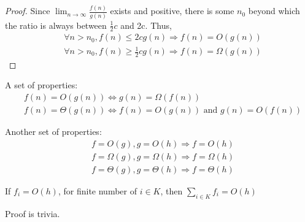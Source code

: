 				\begin{proof}
					Since $\lim_{n\rightarrow \infty} \frac{f(n)}{g(n)}$ exists and positive, there is some $n_0$ beyond which the ratio is always between $\frac12 c$ and 2c. Thus,
					\begin{align}
						& \forall n > n_0, f(n) \le 2cg(n) \Rightarrow f(n) = O(g(n)) \\
						& \forall n > n_0, f(n) \ge \frac12cg(n) \Rightarrow f(n) = \Omega(g(n))
					\end{align}
				\end{proof}

				A set of properties:
				\begin{align}
					& f(n) = O(g(n)) \iff g(n) = \Omega(f(n))\\
					& f(n) = \Theta(g(n)) \iff f(n) = O(g(n)) \text{ and } g(n) = O(f(n))
				\end{align}

				Another set of properties:
				\begin{align}
					& f = O(g), g = O(h) \Rightarrow f=O(h) \\
					& f = \Omega(g), g = \Omega(h) \Rightarrow f=\Omega(h) \\
					& f = \Theta(g), g = \Theta(h) \Rightarrow f=\Theta(h)
				\end{align}

				\begin{theorem}
					If $f_i = O(h)$, for finite number of $i \in K$, then $\sum_{i\in K} f_i = O(h)$
				\end{theorem}

				Proof is trivia.



